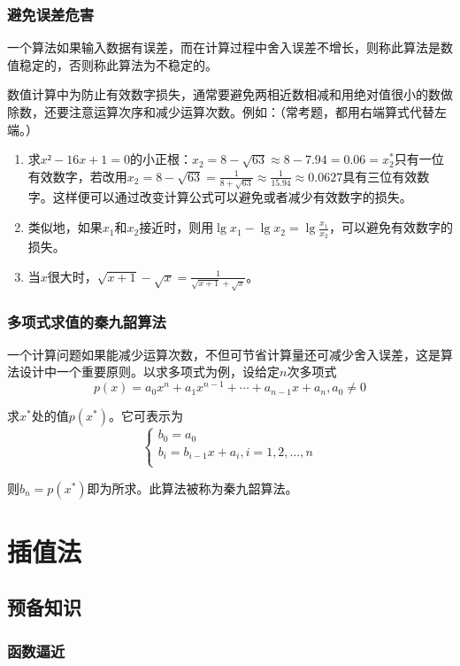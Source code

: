 \documentclass[UTF8,a4paper,11pt,oneside]{ctexbook}
\begin{document}
\subsection{避免误差危害}

一个算法如果输入数据有误差，而在计算过程中舍入误差不增长，则称此算法是数值稳定的，否则称此算法为不稳定的。

数值计算中为防止有效数字损失，通常要避免两相近数相减和用绝对值很小的数做除数，还要注意运算次序和减少运算次数。例如：（常考题，都用右端算式代替左端。）
\begin{enumerate}
    \item 求\(x²-16x+1=0\)的小正根：\(x_2=8-\sqrt{63}\approx8-7.94=0.06=x_2^*\)只有一位有效数字，若改用\(x_2=8-\sqrt{63}=\frac{1}{8+\sqrt{63}}\approx\frac{1}{15.94}\approx0.0627\)具有三位有效数字。这样便可以通过改变计算公式可以避免或者减少有效数字的损失。
    \item 类似地，如果\(x_1\)和\(x_2\)接近时，则用\(\lg x_1-\lg x_2=\lg \frac{x_1}{x_2}\)，可以避免有效数字的损失。
    \item 当\(x\)很大时，\(\sqrt{x+1}-\sqrt{x}=\frac{1}{\sqrt{x+1}+\sqrt{x}}\)。
\end{enumerate}

\subsection{多项式求值的秦九韶算法}

一个计算问题如果能减少运算次数，不但可节省计算量还可减少舍入误差，这是算法设计中一个重要原则。以求多项式为例，设给定\(n\)次多项式
\[
p(x)=a_0x^n+a_1x^{n-1}+\cdots+a_{n-1}x+a_n,a_0\neq0
\]

求\(x^*\)处的值\(p(x^*)\)。它可表示为
\[
\begin{cases}
    b_0=a_0\\
    b_i=b_{i-1}x+a_i,i=1,2,\ldots,n\\
\end{cases}
\]

则\(b_n=p(x^*)\)即为所求。此算法被称为秦九韶算法。

\chapter{插值法}

\section{预备知识}

\subsection{函数逼近}
\end{document}
